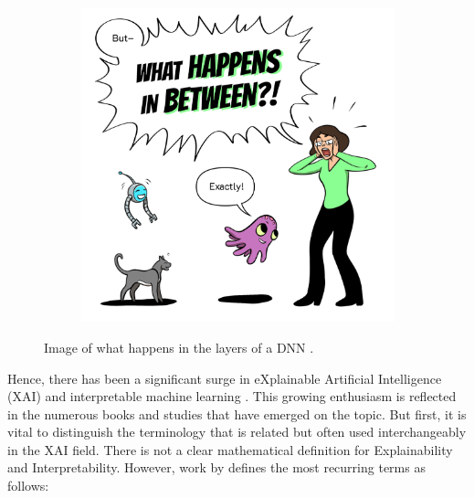 \begin{figure}[h]
\begin{subfigure}[b]{0.45\textwidth}
    \includegraphics[width=\textwidth]{images/dnn-2.png}
    \label{fig:image2}
  \end{subfigure}
  \caption{Image of what happens in the layers of a DNN \cite{google_comics_fact_DNN}.}
  \label{fig:sidebyside}
\end{figure}
Hence, there has been a significant surge in eXplainable Artificial Intelligence (XAI) and interpretable machine learning \citep{goebel2018explainable}. This growing enthusiasm is reflected in the numerous books and studies that have emerged on the topic. But first, it is vital to distinguish the terminology that is related but often used interchangeably in the XAI field. There is not a clear mathematical definition for Explainability and Interpretability. However, work by \citet{arrieta2020explainable} defines the most recurring terms as follows:

